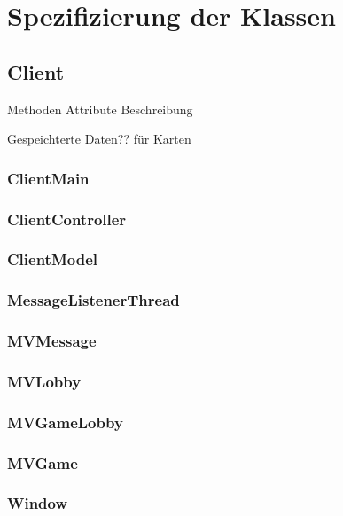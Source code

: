 \documentclass{article}
\begin{document}
\subsection{}
\subsection{}
\subsection{}
\newpage

\section{Spezifizierung der Klassen}
\subsection{Client}
Methoden
Attribute
Beschreibung

Gespeichterte Daten?? für Karten
\subsubsection{ClientMain}
\subsubsection{ClientController}
\subsubsection{ClientModel}
\subsubsection{MessageListenerThread}
\subsubsection{MVMessage}
\subsubsection{MVLobby}
\subsubsection{MVGameLobby}
\subsubsection{MVGame}
\subsubsection{Window}
\end{document}
